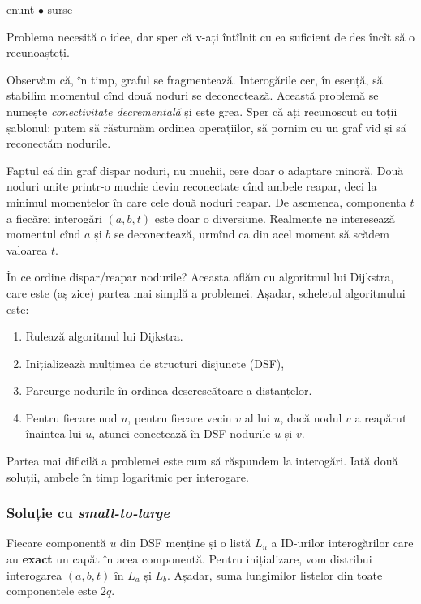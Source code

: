 \documentclass[../main.tex]{subfiles}
\begin{document}
\href{https://kilonova.ro/problems/2020}{enunț}
$\bullet$
\hyperref[code:termite]{surse}

Problema necesită o idee, dar sper că v-ați întîlnit cu ea suficient de des încît să o recunoașteți.

Observăm că, în timp, graful se fragmentează. Interogările cer, în esență, să stabilim momentul cînd două noduri se deconectează. Această problemă se numește \textit{conectivitate decrementală} și este grea. Sper că ați recunoscut cu toții șablonul: putem să răsturnăm ordinea operațiilor, să pornim cu un graf vid și să reconectăm nodurile.

Faptul că din graf dispar noduri, nu muchii, cere doar o adaptare minoră. Două noduri unite printr-o muchie devin reconectate cînd ambele reapar, deci la minimul momentelor în care cele două noduri reapar. De asemenea, componenta $t$ a fiecărei interogări $(a, b, t)$ este doar o diversiune. Realmente ne interesează momentul cînd $a$ și $b$ se deconectează, urmînd ca din acel moment să scădem valoarea $t$.

În ce ordine dispar/reapar nodurile? Aceasta aflăm cu algoritmul lui Dijkstra, care este (aș zice) partea mai simplă a problemei. Așadar, scheletul algoritmului este:

\begin{enumerate}
  \item Rulează algoritmul lui Dijkstra.

  \item Inițializează mulțimea de structuri disjuncte (DSF),

  \item Parcurge nodurile în ordinea descrescătoare a distanțelor.

  \item Pentru fiecare nod $u$, pentru fiecare vecin $v$ al lui $u$, dacă nodul $v$ a reapărut înaintea lui $u$, atunci conectează în DSF nodurile $u$ și $v$.
\end{enumerate}

Partea mai dificilă a problemei este cum să răspundem la interogări. Iată două soluții, ambele în timp logaritmic per interogare.

\subsubsection*{Soluție cu \textit{small-to-large}}

Fiecare componentă $u$ din DSF menține și o listă $L_u$ a ID-urilor interogărilor care au \textbf{exact} un capăt în acea componentă. Pentru inițializare, vom distribui interogarea $(a, b, t)$ în $L_a$ și $L_b$. Așadar, suma lungimilor listelor din toate componentele este $2q$.
\end{document}
